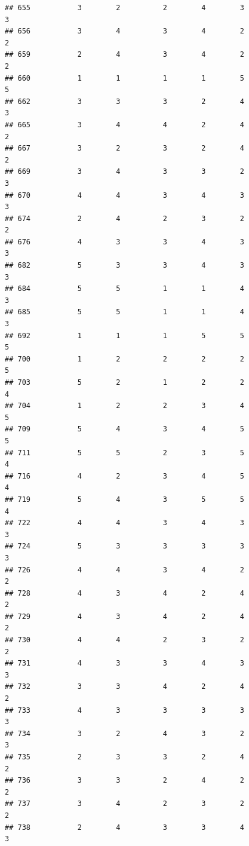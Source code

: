 \documentclass[
]{article}
\begin{document}
\begin{verbatim}
## 655           3        2          2        4        3               3
## 656           3        4          3        4        2               2
## 659           2        4          3        4        2               2
## 660           1        1          1        1        5               5
## 662           3        3          3        2        4               3
## 665           3        4          4        2        4               2
## 667           3        2          3        2        4               2
## 669           3        4          3        3        2               3
## 670           4        4          3        4        3               3
## 674           2        4          2        3        2               2
## 676           4        3          3        4        3               3
## 682           5        3          3        4        3               3
## 684           5        5          1        1        4               3
## 685           5        5          1        1        4               3
## 692           1        1          1        5        5               5
## 700           1        2          2        2        2               5
## 703           5        2          1        2        2               4
## 704           1        2          2        3        4               5
## 709           5        4          3        4        5               5
## 711           5        5          2        3        5               4
## 716           4        2          3        4        5               4
## 719           5        4          3        5        5               4
## 722           4        4          3        4        3               3
## 724           5        3          3        3        3               3
## 726           4        4          3        4        2               2
## 728           4        3          4        2        4               2
## 729           4        3          4        2        4               2
## 730           4        4          2        3        2               2
## 731           4        3          3        4        3               3
## 732           3        3          4        2        4               2
## 733           4        3          3        3        3               3
## 734           3        2          4        3        2               3
## 735           2        3          3        2        4               2
## 736           3        3          2        4        2               2
## 737           3        4          2        3        2               2
## 738           2        4          3        3        4               3

\end{verbatim}
\end{document}
